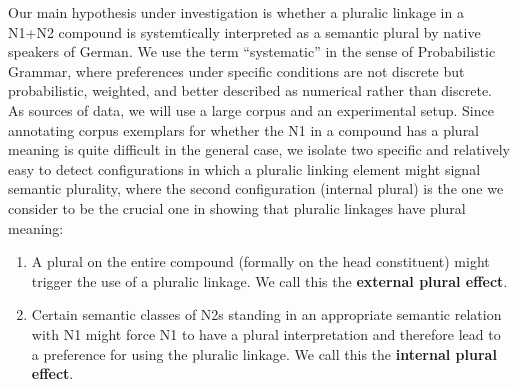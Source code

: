 Our main hypothesis under investigation is whether a pluralic linkage in a N1+N2 compound is systemtically interpreted as a semantic plural by native speakers of German.
We use the term ``systematic'' in the sense of Probabilistic Grammar, where preferences under specific conditions are not discrete but probabilistic, weighted, and better described as numerical rather than discrete.
As sources of data, we will use a large corpus and an experimental setup.
Since annotating corpus exemplars for whether the N1 in a compound has a plural meaning is quite difficult in the general case, we isolate two specific and relatively easy to detect configurations in which a pluralic linking element might signal semantic plurality, where the second configuration (internal plural) is the one we consider to be the crucial one in showing that pluralic linkages have plural meaning:

\vspace{\baselineskip}

\begin{enumerate}
  \item A plural on the entire compound (formally on the head constituent) might trigger the use of a pluralic linkage.
  We call this the \textbf{external plural effect}.
  \item Certain semantic classes of N2s standing in an appropriate semantic relation with N1 might force N1 to have a plural interpretation and therefore lead to a preference for using the pluralic linkage.
  We call this the \textbf{internal plural effect}.
\end{enumerate}

\vspace{\baselineskip}

